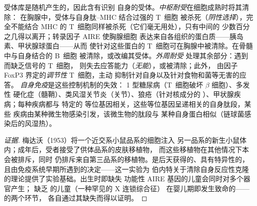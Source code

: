 \begin{definition}[耐受]\label{def:b3:adaptive-immunity:tolerance}
受体库是随机产生的，因此含有识别
自身的受体。\emph{中枢耐受}在细胞成熟时将其清除：
在胸腺中，受体与自身肽--MHC 结合过强的 T~细胞
被杀死（\emph{阴性选择}），完全不能结合 MHC 的
T~细胞同样被杀死（它们毫无用处），只有中间的
少数百分之几得以离开；转录因子 AIRE 使胸腺细胞
表达来自各组织的蛋白质——胰岛素、甲状腺球蛋白——从而
使针对这些蛋白的 T~细胞可在胸腺中被清除。在骨髓中与自身结合的 B~细胞
被清除，或改编其受体。\emph{外周耐受}
处理其余部分：遇到而缺乏信号的 T~细胞，
则失去应答能力（\emph{无能}），或被清除；此外，
由因子 FoxP3 界定的\emph{调节性} T~细胞，主动
抑制针对自身以及针对食物和菌等无害的应答。
\emph{自身免疫}是这些控制机制的失效：
1 型糖尿病（T~细胞破坏 $\beta$ 细胞）、多发性
硬化症（髓鞘）、类风湿关节炎（关节）、狼疮（针对核成分的
）、甲状腺疾病；每种疾病都与
特定的  等位基因相关，这些等位基因呈递相关的自身肽段，某些
疾病由某种微生物感染引发，该微生物的肽段与
某种自身蛋白相似（链球菌感染后的风湿热）。
\end{definition}

\begin{proof}[证据]
梅达沃（1953）将一个近交系小鼠品系的细胞注入
另一品系的新生小鼠体内；成年后，受者接受了供体品系的皮肤移植物，
而这些移植物在其他情况下本会被排斥，同时
仍排斥来自第三品系的移植物。是后天获得的、具有特异性的，
且由免疫系统早期所遇到的决定——这一实验为
伯内特关于清除自身反应性克隆的理论提供了实验基础。出生时即缺失
功能性 AIRE 基因的儿童会同时对多个器官产生；
缺乏  的儿童（一种罕见的 X 连锁综合征）
在婴儿期即发生致命的——的两个环节，
各自通过其缺失而得以证明。
\end{proof}

